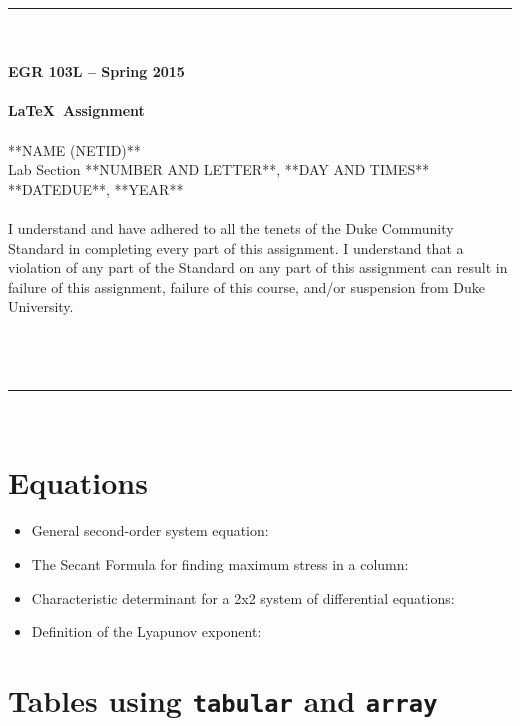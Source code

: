 \documentclass{article}
\begin{document}
\begin{center}
\rule{6.5in}{0.5mm}\\~\\
{\bf \large EGR 103L -- Spring 2015}\\~\\
{\huge \bf \LaTeX~Assignment}\\~\\
**NAME (NETID)**\\
Lab Section **NUMBER AND LETTER**, **DAY AND TIMES**\\
**DATEDUE**, **YEAR**\\~\\
{\small I understand and have adhered to all the tenets of the Duke
  Community Standard in completing every part of this assignment.  I
  understand that a violation of any part of the Standard on any part
  of this assignment can result in failure of this assignment, failure
  of this course, and/or suspension from Duke University.} 
~\\~\\~\\~\\
\rule{6.5in}{0.5mm}\\
\end{center}
\tableofcontents
\listoffigures
\pagebreak

\section{Equations} %
\begin{itemize}
\item General second-order system equation\cite[p.~221]{Rizzoni}:
\item The Secant Formula for finding maximum stress 
in a column\cite[p.~681]{Hibbeler}:
\item Characteristic determinant for a 2x2 system of 
differential equations\cite[p.~152]{Kreyszig}:
\item Definition of the Lyapunov exponent\cite[p.~56]{Ott}:
\end{itemize}

\section{Tables using {\tt tabular} and {\tt array}}
\end{document}
